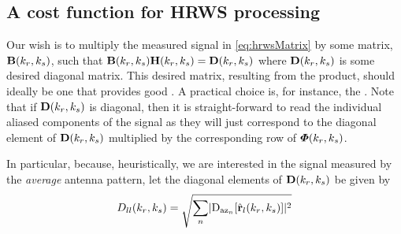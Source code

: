 \subsection{A cost function for HRWS processing}
Our wish is to multiply the measured signal in \eqref{eq:hrwsMatrix} by some matrix, $\hrwsFilterMatrix(\kargs)$, such that $\hrwsFilterMatrix(\kargs)\antennaMatrix(\kargs) = \diagAntennaMatrix(\kargs)$ where $\diagAntennaMatrix(\kargs)$ is some desired diagonal matrix. This desired matrix, resulting from the product, should ideally be one that provides good . A practical choice is, for instance, the .  
Note that if $\diagAntennaMatrix(\kargs)$ is diagonal, then it is straight-forward to read the individual aliased components of the signal as they will just correspond to the diagonal element of $\diagAntennaMatrix(\kargs)$ multiplied by the corresponding row of $\boldsymbol{\varPhi}(k_r,k_{s})$.
\par
In particular, because, heuristically, we are interested in the signal measured by the {\em average} antenna pattern, let the diagonal elements of $\diagAntennaMatrix(\kargs)$ be given by
\begin{equation}
 \gweight{ll}(\kargs) = \sqrt{\sum_n\lvert\dazPattern{\channelIndex}[\uRangeVectorl{l}{\kargs}]\rvert^2}
 \label{eq:averagePattern}
\end{equation}
